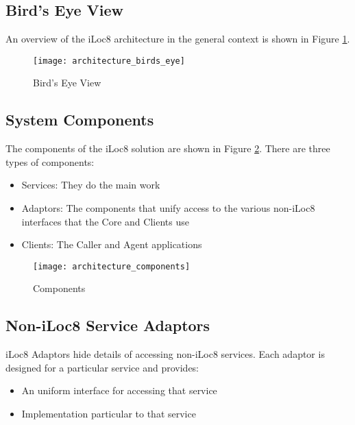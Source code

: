 \documentclass{article}
\begin{document}
	\subsection{Bird's Eye View}
	
	An overview of the iLoc8 architecture in the general context is shown in Figure \ref{fig:architecture_birds_eye}.
	
	\begin{figure}[htbp]
		\hspace{-2cm}
		\texttt{[image: architecture\_birds\_eye]}
		\caption{Bird's Eye View}
		\label{fig:architecture_birds_eye}
	\end{figure}

	\newpage
	
	\subsection{System Components}
	
	The components of the iLoc8 solution are shown in Figure \ref{fig:architecture_components}. There are three types of components:
	\begin{itemize}
		\item Services: They do the main work
		\item Adaptors: The components that unify access to the various non-iLoc8 interfaces that the Core and Clients use
		\item Clients: The Caller and Agent applications
	\end{itemize}
	
	\begin{figure}[htbp]
		\hspace{-2cm}
		\texttt{[image: architecture\_components]}
		\caption{Components}
		\label{fig:architecture_components}
	\end{figure}

	\subsection{Non-iLoc8 Service Adaptors}
	
	iLoc8 Adaptors hide details of accessing non-iLoc8 services. Each adaptor is designed for a particular service and provides:
	\begin{itemize}
		\item An uniform interface for accessing that service
		\item Implementation particular to that service
	\end{itemize}
	
\end{document}
